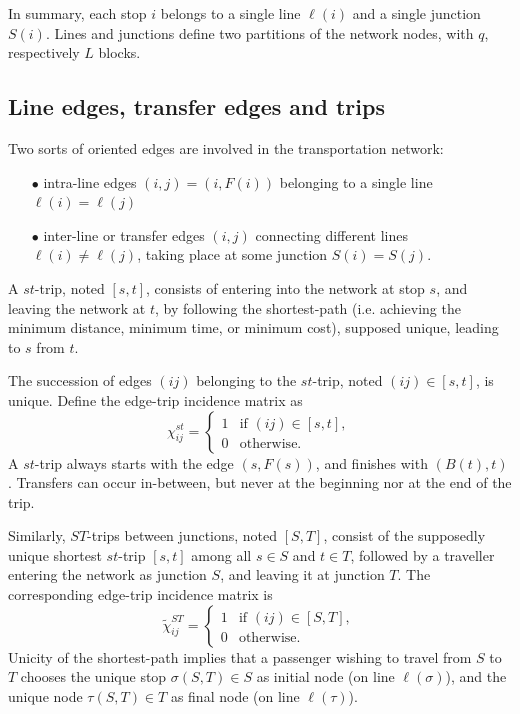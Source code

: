 \documentclass{llncs}
\begin{document}
In summary, each stop $i$ belongs to a single line $\ell(i)$ and a single junction $S(i)$. Lines and junctions define two partitions of the network nodes, with $q$, respectively $L$ blocks.

\subsection{Line edges, transfer edges and trips}
\label{Line edges, transfer edges and trips}
Two sorts of oriented edges are involved in the transportation network: 
\begin{enumerate}
  \item[$\bullet$] intra-line edges $(i,j)=(i,F(i))$ belonging to a single line  $\ell(i)=\ell(j)$
  \item[$\bullet$] inter-line or transfer edges $(i,j)$ connecting different lines $\ell(i)\neq \ell(j)$, taking place at some junction $S(i)=S(j)$. 
  \end{enumerate}
A $st$-trip, noted $[s,t]$, consists of entering into the network at stop $s$, and leaving the network at $t$, by following the shortest-path (i.e. achieving the minimum distance,  minimum time, or  minimum cost), supposed unique, leading to $s$ from $t$. 

The succession of edges $(ij)$ belonging to the $st$-trip, noted $(ij)\in [s,t]$, is unique. Define the edge-trip incidence matrix as
\begin{equation}
\label{edgetrip}
\chi_{ij}^{st} = \begin{cases}
  1    & \text{if $(ij)\in [s,t]$}, \\
  0    & \text{otherwise}.
\end{cases}
\end{equation}
A $st$-trip always starts with the edge $(s,F(s))$, and finishes with $(B(t),t)$. Transfers can occur in-between, but never at the beginning nor at the end of the trip. 

\vspace*{0.1cm}

Similarly, $ST$-trips between junctions, noted $[S,T]$, consist of the supposedly unique shortest $st$-trip $[s,t]$ among all  $s\in S$ and $t\in T$, followed by a traveller entering the network as junction $S$, and leaving it at junction $T$. The corresponding edge-trip incidence matrix is 
\begin{equation}
\label{edgetripjunction}
\tilde{\chi}_{ij}^{ST} = \begin{cases}
  1    & \text{if $(ij)\in [S,T]$}, \\
  0    & \text{otherwise}.
\end{cases}
\end{equation}
Unicity of the shortest-path implies that a passenger wishing to travel from $S$ to $T$ chooses the unique stop $\sigma(S,T)\in S$  as initial node (on line $\ell(\sigma)$), and the unique node $\tau(S,T)\in T$ as final node (on line $\ell(\tau)$). 
\end{document}
